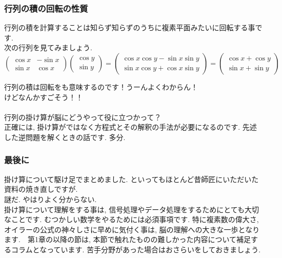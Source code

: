 \documentclass[11pt,a4paper]{jreport}
\begin{document}
\subsubsection{行列の積の回転の性質}
行列の積を計算することは知らず知らずのうちに複素平面みたいに回転する事です. \\
次の行列を見てみましょう.\\
\[
  \left(	
  \begin{array}{cc}
  \cos x & -\sin x \\
  \sin x & \cos x
  \end{array}
  \right)
  \left(
  \begin{array}{c}
  \cos y \\
  \sin y
  \end{array}
  \right)
  =
  \left(
  \begin{array}{l}
  \cos x\cos y - \sin x\sin y\\
  \sin x\cos y + \cos x\sin y
  \end{array}
  \right)
  =
  \left(
  \begin{array}{c}
  \cos x + \cos y\\
  \sin x + \sin y
  \end{array}
  \right)
\]

行列の積は回転をも意味するのです！うーんよくわからん！\\
けどなんかすごそう！！\\
\\
行列の掛け算が脳にどうやって役に立つかって？\\
正確には, 掛け算がではなく方程式とその解釈の手法が必要になるのです. 先述した逆問題を解くときの話です. 多分. 
\\
\subsubsection{最後に}
掛け算について駆け足でまとめました. といってもほとんど昔師匠にいただいた資料の焼き直しですが. \\
謎だ. やはりよく分からない.\\
掛け算について理解をする事は, 信号処理やデータ処理をするためにとても大切なことです. むつかしい数学をやるためには必須事項です. 特に複素数の偉大さ, オイラーの公式の神々しさに早めに気付く事は, 脳の理解への大きな一歩となります.　第1章の以降の節は, 本節で触れたものの難しかった内容について補足するコラムとなっています. 苦手分野があった場合はおさらいをしておきましょう. \\
\\
\end{document}
